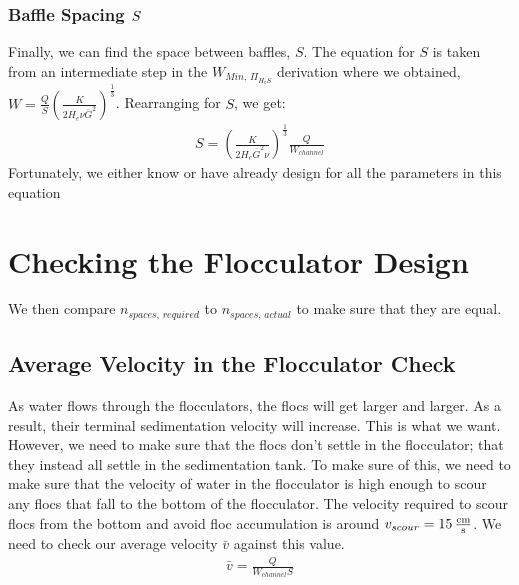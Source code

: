 \documentclass[letterpaper,10pt,english]{sphinxmanual}
\begin{document}
\subsubsection{Baffle Spacing \protect\(S\protect\)}
\label{\detokenize{Flocculation/Floc_Design:baffle-spacing}}
Finally, we can find the space between baffles, \(S\). The equation for \(S\) is taken from an intermediate step in the \(W_{Min, \, \Pi_{H_eS}}\) derivation where we obtained, \(W = \frac{Q}{S}\left( \frac{K}{2 H_e \nu \bar G^2} \right)^\frac{1}{3}\). Rearranging for \(S\), we get:
\begin{equation}\label{equation:Flocculation/Floc_Design:Flocculation/Floc_Design:29}
\begin{split}S = \left( \frac{K}{2 H_e \bar G^2 \nu } \right)^\frac{1}{3} \frac{Q}{W_{channel}}\end{split}
\end{equation}
Fortunately, we either know or have already design for all the parameters in this equation


\section{Checking the Flocculator Design}
\label{\detokenize{Flocculation/Floc_Design:checking-the-flocculator-design}}
We then compare \(n_{spaces, \, required}\) to \(n_{spaces, \, actual}\) to make sure that they are equal.


\subsection{Average Velocity in the Flocculator Check}
\label{\detokenize{Flocculation/Floc_Design:average-velocity-in-the-flocculator-check}}
As water flows through the flocculators, the flocs will get larger and larger. As a result, their terminal sedimentation velocity will increase. This is what we want. However, we need to make sure that the flocs don’t settle in the flocculator; that they instead all settle in the sedimentation tank. To make sure of this, we need to make sure that the velocity of water in the flocculator is high enough to scour any flocs that fall to the bottom of the flocculator. The velocity required to scour flocs from the bottom and avoid floc accumulation is around \(v_{scour} = 15 \, {\rm \frac{cm}{s}}\). We need to check our average velocity \(\bar v\) against this value.
\begin{equation}\label{equation:Flocculation/Floc_Design:Flocculation/Floc_Design:30}
\begin{split}\bar v = \frac{Q}{W_{channel} S}\end{split}
\end{equation}
\end{document}
